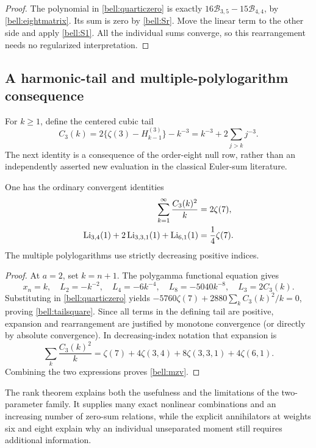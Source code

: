 \begin{proof}
The polynomial in \eqref{bell:quarticzero} is exactly
$16\mathcal B_{3,5}-15\mathcal B_{4,4}$, by \eqref{bell:eightmatrix}.
Its sum is zero by \eqref{bell:Sr}. Move the linear term to the other
side and apply \eqref{bell:S1}. All the individual sums converge,
so this rearrangement needs no regularized interpretation.
\end{proof}

\subsection{A harmonic-tail and multiple-polylogarithm consequence}

For $k\ge1$, define the centered cubic tail
\[
 C_3(k)=2\{\zeta(3)-H_{k-1}^{(3)}\}-k^{-3}
       =k^{-3}+2\sum_{j>k}j^{-3}.
\]
The next identity is a consequence of the order-eight null row, rather
than an independently asserted new evaluation in the classical Euler-sum
literature.

\begin{corollary}
\label{bell:harmonic}
One has the ordinary convergent identities
\begin{align}
 \sum_{k=1}^{\infty}\frac{C_3(k)^2}{k}&=2\zeta(7),\label{bell:tailsquare}\\
 \operatorname{Li}_{3,4}(1)+2\operatorname{Li}_{3,3,1}(1)+\operatorname{Li}_{6,1}(1)&=\frac14\zeta(7).
 \label{bell:mzv}
\end{align}
The multiple polylogarithms use strictly decreasing positive indices.
\end{corollary}

\begin{proof}
At $a=2$, set $k=n+1$. The polygamma functional equation gives
\[
 x_n=k,\quad L_2=-k^{-2},\quad L_4=-6k^{-4},\quad
 L_8=-5040k^{-8},\quad L_3=2C_3(k).
\]
Substituting in \eqref{bell:quarticzero} yields
$-5760\zeta(7)+2880\sum_k C_3(k)^2/k=0$, proving
\eqref{bell:tailsquare}. Since all terms in the defining tail are
positive, expansion and rearrangement are justified by monotone
convergence (or directly by absolute convergence). In decreasing-index
notation that expansion is
\[
 \sum_k\frac{C_3(k)^2}{k}
 =\zeta(7)+4\zeta(3,4)+8\zeta(3,3,1)+4\zeta(6,1).
\]
Combining the two expressions proves \eqref{bell:mzv}.
\end{proof}

The rank theorem explains both the usefulness and the limitations of
the two-parameter family. It supplies many exact nonlinear combinations
and an increasing number of zero-sum relations, while the explicit
annihilators at weights six and eight explain why an individual
unseparated moment still requires additional information.

